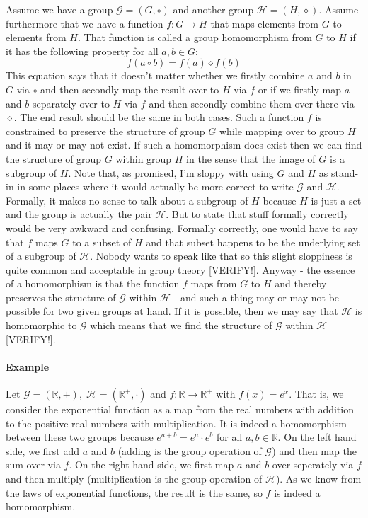 Assume we have a group $\mathcal{G} = (G, \circ)$ and another group $\mathcal{H} = (H, \diamond)$. Assume furthermore that we have a function $f: G \rightarrow H$ that maps elements from $G$ to elements from $H$. That function is called a group homomorphism from $G$ to $H$ if it has the following property for all $a,b \in G$:
\begin{equation}
	f(a \circ b) = f(a) \diamond f(b)
\end{equation}
This equation says that it doesn't matter whether we firstly combine $a$ and $b$ in $G$ via $\circ$ and then secondly map the result over to $H$ via $f$ or if we firstly map $a$ and $b$ separately over to $H$ via $f$ and then secondly combine them over there via $\diamond$. The end result should be the same in both cases. Such a function $f$ is constrained to preserve the structure of group $G$ while mapping over to group $H$ and it may or may not exist. If such a homomorphism does exist then we can find the structure of group $G$ within group $H$ in the sense that the image of $G$ is a subgroup of $H$. Note that, as promised, I'm sloppy with using $G$ and $H$ as stand-in in some places where it would actually be more correct to write $\mathcal{G}$ and $\mathcal{H}$. Formally, it makes no sense to talk about a subgroup of $H$ because $H$ is just a set and the group is actually the pair $\mathcal{H}$. But to state that stuff formally correctly would be very awkward and confusing. Formally correctly, one would have to say that $f$ maps $G$ to a subset of $H$ and that subset happens to be the underlying set of a subgroup of $\mathcal{H}$. Nobody wants to speak like that so this slight sloppiness is quite common and acceptable in group theory [VERIFY!]. Anyway - the essence of a homomorphism is that the function $f$ maps from $G$ to $H$ and thereby preserves the structure of $\mathcal{G}$ within $\mathcal{H}$ - and such a thing may or may not be possible for two given groups at hand. If it is possible, then we may say that $\mathcal{H}$ is homomorphic to $\mathcal{G}$ which means that we find the structure of $\mathcal{G}$ within $\mathcal{H}$ [VERIFY!].

\paragraph{Example}
Let  $\mathcal{G} = (\mathbb{R}, +), \; \mathcal{H} = (\mathbb{R}^+, \cdot)$ and $f: \mathbb{R} \rightarrow \mathbb{R}^+$ with $f(x) = e^x$. That is, we consider the exponential function as a map from the real numbers with addition to the positive real numbers with multiplication. It is indeed a homomorphism between these two groups because $e^{a+b} = e^a \cdot e^b$ for all $a,b \in \mathbb{R}$. On the left hand side, we first add $a$ and $b$ (adding is the group operation of $\mathcal{G}$) and then map the sum over via $f$. On the right hand side, we first map $a$ and $b$ over seperately via $f$ and then multiply (multiplication is the group operation of $\mathcal{H}$). As we know from the laws of exponential functions, the result is the same, so $f$ is indeed a homomorphism.

